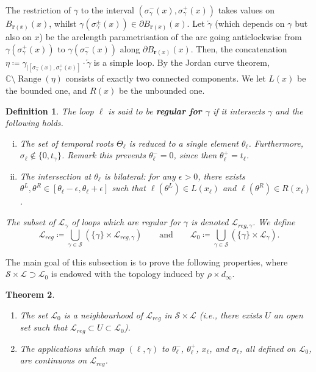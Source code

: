\documentclass[11pt]{article}
\newtheorem{theorem}{Theorem}[section]
\newtheorem{definition}[theorem]{Definition}
\DeclareMathOperator{\Range}{Range}
\def\rhos{\mathbf{r}}
\begin{document}
The restriction of $\gamma$ to the interval $(\sigma_\gamma^-(x), \sigma_\gamma^+(x))$ takes values on $B_{\rhos(x)}(x)$, whilst $\gamma(\sigma_\gamma^\pm(x))\in \partial B_{\rhos(x)}(x)$. Let $ \overleftarrow{\gamma}$ (which depends on $\gamma$ but also on $x$) be the arclength parametrisation of the arc going anticlockwise from
$\gamma(\sigma_\gamma^+(x))$ to $\gamma(\sigma_\gamma^-(x))$ along $\partial B_{\rhos(x)}(x)$. Then, the concatenation $\eta\coloneqq \gamma_{|[\sigma_\gamma^-(x), \sigma_\gamma^+(x)]}\cdot \overleftarrow{\gamma}$ is a simple loop.  By the Jordan curve theorem, $\mathbb{C}\setminus \Range(\eta)$ consists of exactly two connected components. We let $L(x)$ be the bounded one, and $R(x)$ be the unbounded one.
\begin{definition}
\label{eq:def:reg}
    The loop $\ell$ is said to be {\bf regular for $\gamma$} if it intersects $\gamma$ and the following holds.
    \begin{enumerate}[i)]
    \item \label{item:prop1} The set of temporal roots $\Theta_\ell$ is reduced to a single element $\theta_\ell$. Furthermore, $\sigma_\ell\notin \{0,t_\gamma\}$.
     Remark this prevents $\theta^-_\ell=0$, since then $\theta^+_\ell=t_\ell$.
    \item \label{item:prop2} The intersection at $\theta_\ell$ is bilateral: for any $\epsilon>0$, there exists $\theta^L,\theta^R\in [\theta_\ell-\epsilon,\theta_\ell+\epsilon]$ such that
    $\ell(\theta^L)\in L(x_\ell)$ and $\ell(\theta^R)\in R(x_\ell)$.
    \end{enumerate}
    The subset of $\mathscr{L}_\gamma$ of loops which are regular for $\gamma$ is denoted $\mathscr{L}_{reg,\gamma}$. We define
		\[ \mathscr{L}_{reg}\coloneqq \bigcup_{\gamma\in \mathscr{S}} (\{\gamma\} \times \mathscr{L}_{reg,\gamma}) \qquad \mbox{and} \qquad
		\mathscr{L}_0\coloneqq\bigcup_{\gamma\in \mathscr{S}} (\{\gamma\} \times \mathscr{L}_{\gamma}).\]
\end{definition}
The main goal of this subsection is to prove the following properties, 	where	$\mathscr{S}\times \mathscr{L}\supset \mathscr{L}_0$ is endowed with the topology induced by $\rho\times d_\infty$.
\begin{theorem}\
    \label{th:rerootingcontinuity}
    \begin{enumerate}
    \item   \label{th:rerootingcontinuity1} The set $\mathscr{L}_0$ is a neighbourhood of $\mathscr{L}_{reg}$ in $\mathscr{S}\times \mathscr{L}$ (i.e., there exists $U$ an open set such that $\mathscr{L}_{reg} \subset U \subset \mathscr{L}_0$).
    \item \label{th:rerootingcontinuity2}   The applications which map $(\ell,\gamma)$ to $\theta^-_\ell$, $\theta^+_\ell$, $x_\ell$, and $\sigma_\ell$, all defined on
    $\mathscr{L}_0$,
    are continuous on $\mathscr{L}_{reg}$.
    \end{enumerate}
\end{theorem}
\end{document}
